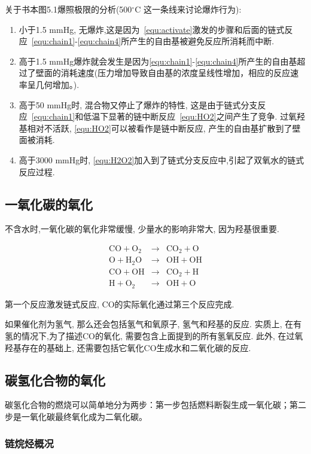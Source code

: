 关于书本图5.1爆照极限的分析(500$^\circ$C 这一条线来讨论爆炸行为):
\begin{enumerate}
    \item 小于1.5 mmHg, 无爆炸,这是因为~\ref{equ:activate}激发的步骤和后面的链式反应~\ref{equ:chain1}-\ref{equ:chain4}所产生的自由基被避免反应所消耗而中断.
    \item 高于1.5 mmHg爆炸就会发生是因为\ref{equ:chain1}-\ref{equ:chain4}所产生的自由基超过了壁面的消耗速度(压力增加导致自由基的浓度呈线性增加，相应的反应速率呈几何增加。).
    \item 高于50 mmHg时, 混合物又停止了爆炸的特性, 这是由于链式分支反应~\ref{equ:chain1}和低温下显著的链中断反应~\ref{equ:HO2}之间产生了竞争. 过氧羟基相对不活跃, \ref{equ:HO2}可以被看作是链中断反应, 产生的自由基扩散到了壁面被消耗.
    \item 高于3000 mmHg时, \ref{equ:H2O2}加入到了链式分支反应中,引起了双氧水的链式反应过程.
\end{enumerate}

\subsection{一氧化碳的氧化}

不含水时,一氧化碳的氧化非常缓慢, 少量水的影响非常大, 因为羟基很重要.

\begin{eqnarray}
    \mathrm{CO+O_2} &\to& \mathrm{CO_2+O} \\
    \mathrm{O + H_2O} &\to& \mathrm{OH + OH} \\
    \mathrm{CO + OH} &\to& \mathrm{CO_2 + H} \label{equ:CO_burn}\\
    \mathrm{H + O_2} &\to& \mathrm{OH + O}
\end{eqnarray}

第一个反应激发链式反应, CO的实际氧化通过第三个反应完成.

如果催化剂为氢气, 那么还会包括氢气和氧原子, 氢气和羟基的反应. 实质上, 在有氢的情况下,为了描述CO的氧化, 需要包含上面提到的所有氢氧反应. 此外, 在过氧羟基存在的基础上, 还需要包括它氧化CO生成水和二氧化碳的反应.

\subsection{碳氢化合物的氧化}
碳氢化合物的燃烧可以简单地分为两步：第一步包括燃料断裂生成一氧化碳；第二步是一氧化碳最终氧化成为二氧化碳。

\subsubsection{链烷烃概况}

